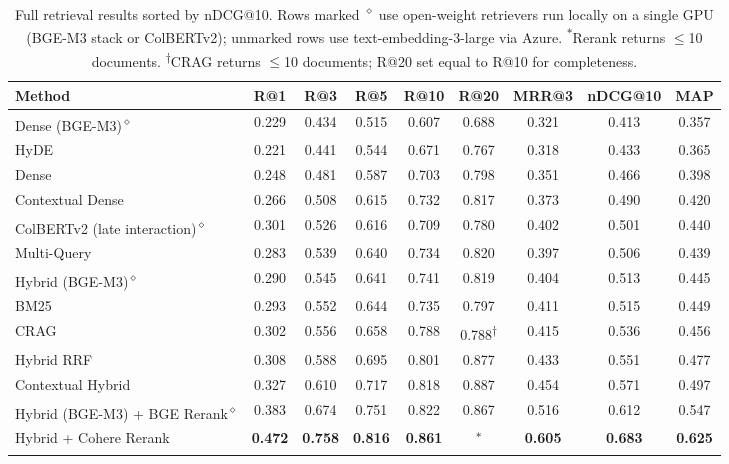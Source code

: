 \documentclass{article}
\begin{document}
\begin{table}[!t]
\centering
\footnotesize
\setlength{\tabcolsep}{4pt}
\begin{tabular}{lcccccccc}
\toprule
\textbf{Method} & \textbf{R@1} & \textbf{R@3} & \textbf{R@5} & \textbf{R@10} & \textbf{R@20} & \textbf{MRR@3} & \textbf{nDCG@10} & \textbf{MAP} \\
\midrule
Dense (BGE-M3)\textsuperscript{$\diamond$}
                  & 0.229 & 0.434 & 0.515 & 0.607 & 0.688 & 0.321 & 0.413 & 0.357 \\
HyDE              & 0.221 & 0.441 & 0.544 & 0.671 & 0.767 & 0.318 & 0.433 & 0.365 \\
Dense             & 0.248 & 0.481 & 0.587 & 0.703 & 0.798 & 0.351 & 0.466 & 0.398 \\
Contextual Dense  & 0.266 & 0.508 & 0.615 & 0.732 & 0.817 & 0.373 & 0.490 & 0.420 \\
ColBERTv2 (late interaction)\textsuperscript{$\diamond$}
                  & 0.301 & 0.526 & 0.616 & 0.709 & 0.780 & 0.402 & 0.501 & 0.440 \\
Multi-Query       & 0.283 & 0.539 & 0.640 & 0.734 & 0.820 & 0.397 & 0.506 & 0.439 \\
Hybrid (BGE-M3)\textsuperscript{$\diamond$}
                  & 0.290 & 0.545 & 0.641 & 0.741 & 0.819 & 0.404 & 0.513 & 0.445 \\
BM25              & 0.293 & 0.552 & 0.644 & 0.735 & 0.797 & 0.411 & 0.515 & 0.449 \\
CRAG              & 0.302 & 0.556 & 0.658 & 0.788 & 0.788\textsuperscript{$\dagger$} & 0.415 & 0.536 & 0.456 \\
Hybrid RRF        & 0.308 & 0.588 & 0.695 & 0.801 & 0.877 & 0.433 & 0.551 & 0.477 \\
Contextual Hybrid & 0.327 & 0.610 & 0.717 & 0.818 & 0.887 & 0.454 & 0.571 & 0.497 \\
Hybrid (BGE-M3) + BGE Rerank\textsuperscript{$\diamond$}
                  & 0.383 & 0.674 & 0.751 & 0.822 & 0.867 & 0.516 & 0.612 & 0.547 \\
Hybrid + Cohere Rerank
                  & \textbf{0.472} & \textbf{0.758} & \textbf{0.816} & \textbf{0.861} & \textsuperscript{$\ast$} & \textbf{0.605} & \textbf{0.683} & \textbf{0.625} \\
\bottomrule
\end{tabular}
\vspace{4pt}
\caption{Full retrieval results sorted by nDCG@10. Rows marked \textsuperscript{$\diamond$} use open-weight retrievers run locally on a single GPU (BGE-M3 stack or ColBERTv2); unmarked rows use text-embedding-3-large via Azure. \textsuperscript{$\ast$}Rerank returns $\leq$10 documents. \textsuperscript{$\dagger$}CRAG returns $\leq$10 documents; R@20 set equal to R@10 for completeness.}
\label{tab:full_results}
\end{table}
\end{document}

